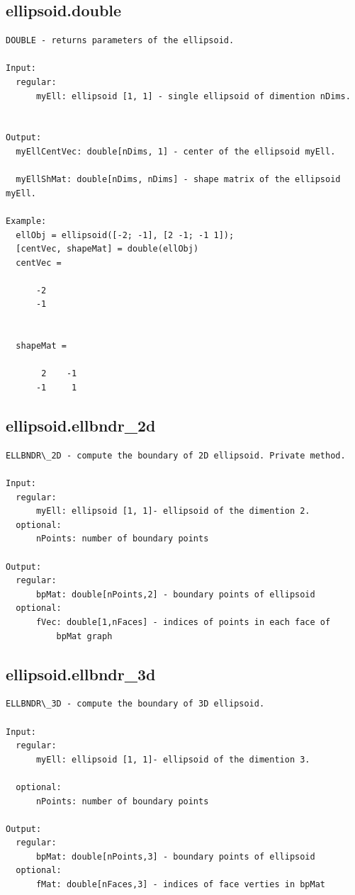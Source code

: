 \documentclass[letterpaper,10pt,english]{sphinxmanual}
\begin{document}
\subsection{ellipsoid.double}
\label{chap_functions:ellipsoid-double}
\begin{Verbatim}[commandchars=\\\{\}]
DOUBLE - returns parameters of the ellipsoid.

Input:
  regular:
      myEll: ellipsoid [1, 1] - single ellipsoid of dimention nDims.


Output:
  myEllCentVec: double[nDims, 1] - center of the ellipsoid myEll.

  myEllShMat: double[nDims, nDims] - shape matrix of the ellipsoid myEll.

Example:
  ellObj = ellipsoid([-2; -1], [2 -1; -1 1]);
  [centVec, shapeMat] = double(ellObj)
  centVec =

      -2
      -1


  shapeMat =

       2    -1
      -1     1
\end{Verbatim}


\subsection{ellipsoid.ellbndr\_2d}
\label{chap_functions:ellipsoid-ellbndr-2d}
\begin{Verbatim}[commandchars=\\\{\}]
ELLBNDR\_2D - compute the boundary of 2D ellipsoid. Private method.

Input:
  regular:
      myEll: ellipsoid [1, 1]- ellipsoid of the dimention 2.
  optional:
      nPoints: number of boundary points

Output:
  regular:
      bpMat: double[nPoints,2] - boundary points of ellipsoid
  optional:
      fVec: double[1,nFaces] - indices of points in each face of
          bpMat graph
\end{Verbatim}


\subsection{ellipsoid.ellbndr\_3d}
\label{chap_functions:ellipsoid-ellbndr-3d}
\begin{Verbatim}[commandchars=\\\{\}]
ELLBNDR\_3D - compute the boundary of 3D ellipsoid.

Input:
  regular:
      myEll: ellipsoid [1, 1]- ellipsoid of the dimention 3.

  optional:
      nPoints: number of boundary points

Output:
  regular:
      bpMat: double[nPoints,3] - boundary points of ellipsoid
  optional:
      fMat: double[nFaces,3] - indices of face verties in bpMat
\end{Verbatim}
\end{document}
